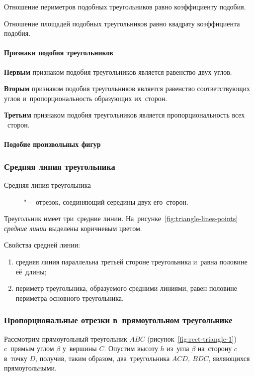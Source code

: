 \documentclass[]{scrartcl}
\begin{document}
Отношение периметров подобных треугольников равно коэффициенту подобия.

Отношение площадей подобных треугольников равно квадрату коэффициента подобия.

\paragraph{Признаки подобия треугольников}\label{similarity-of-triangles-signs}

\textbf{Первым} признаком подобия треугольников является равенство двух углов.

\textbf{Вторым} признаком подобия треугольников является равенство соответствующих углов и~пропорциональность образующих их~сторон.

\textbf{Третьим} признаком подобия треугольников является пропорциональность всех ~сторон.

\paragraph{Подобие произвольных фигур}

\subsubsection{Средняя линия треугольника}
\begin{description}
	\item[Средняя линия треугольника] "--- отрезок, соединяющий середины двух его~сторон.
\end{description}
Треугольник имеет три~средние линии. На~рисунке~\ref{fig:triangle-lines-points} \emph{средние линии} выделены коричневым цветом.

Свойства средней линии:
\begin{enumerate}
	\item средняя линия параллельна третьей стороне треугольника и~равна половине её~длины;
	\item периметр треугольника, образуемого средними линиями, равен половине периметра основного треугольника.
\end{enumerate}

\subsubsection{Пропорциональные отрезки в~прямоугольном треугольнике}
Рассмотрим прямоугольный треугольник ${\displaystyle ABC}$ (рисунок~\ref{fig:rect-triangle-1}) c~прямым углом ${\displaystyle \beta}$ у~вершины ${\displaystyle C}$. Опустим высоту ${\displaystyle h}$ из~угла ${\displaystyle \beta}$ на~сторону ${\displaystyle c}$ в~точку ${\displaystyle D}$, получив, таким образом, два~треугольника ${\displaystyle ACD,\ BDC}$, являющихся прямоугольными.
\end{document}
